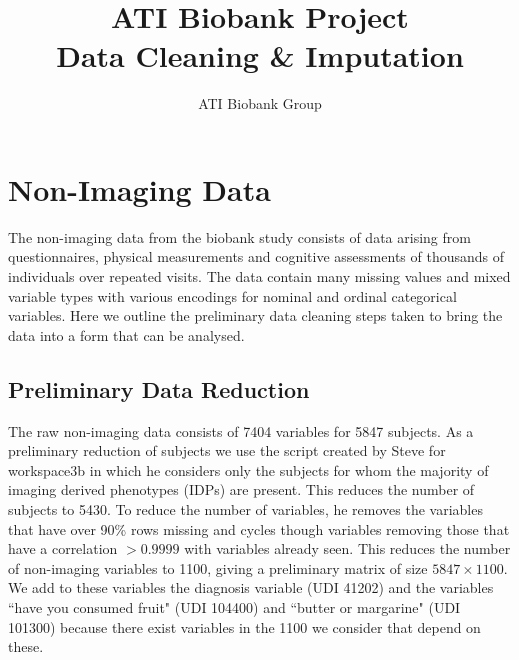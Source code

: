 \documentclass{article}
\begin{document}
\title{ATI Biobank Project \\ Data Cleaning \& Imputation}

\author{ATI Biobank Group}
\maketitle


\section{Non-Imaging Data}
The non-imaging data from the biobank study consists of data arising from questionnaires, physical measurements and cognitive assessments of thousands of individuals over repeated visits. The data contain many missing values and mixed variable types with various encodings for nominal and ordinal categorical variables. Here we outline the preliminary data cleaning steps taken to bring the data into a form that can be analysed.


\subsection*{Preliminary Data Reduction}
The raw non-imaging data consists of 7404 variables for 5847 subjects. As a preliminary reduction of subjects we use the script created by Steve for workspace3b in which he considers only the subjects for whom the majority of imaging derived phenotypes (IDPs) are present. This reduces the number of subjects to 5430. To reduce the number of variables, he removes the variables that have over 90\% rows missing and cycles though variables removing those that have a correlation $>0.9999$ with variables already seen. This reduces the number of non-imaging variables to 1100, giving a preliminary matrix of size $5847 \times 1100$. We add to these variables the diagnosis variable (UDI 41202) and the variables ``have you consumed fruit" (UDI 104400) and ``butter or margarine" (UDI 101300) because there exist variables in the 1100 we consider that depend on these.
\end{document}
